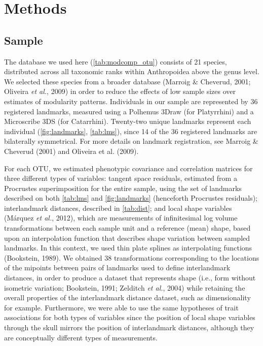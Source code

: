 \documentclass[12pt,twoside]{report}
\begin{document}
\section{Methods}\label{methods}

\subsection{Sample}\label{sample}

The database we used here (\autoref{tab:modcomp_otu}) consists of 21
species, distributed across all taxonomic ranks within Anthropoidea
above the genus level. We selected these species from a broader database
(Marroig \& Cheverud, 2001; Oliveira \emph{et al.}, 2009) in order to
reduce the effects of low sample sizes over estimates of modularity
patterns. Individuals in our sample are represented by 36 registered
landmarks, measured using a Polhemus 3Draw (for Platyrrhini) and a
Microscribe 3DS (for Catarrhini). Twenty-two unique landmarks represent
each individual (\autoref{fig:landmarks}, \autoref{tab:lms}), since 14
of the 36 registered landmarks are bilaterally symmetrical. For more
details on landmark registration, see Marroig \& Cheverud (2001) and
Oliveira et al. (2009).



For each OTU, we estimated phenotypic covariance and correlation
matrices for three different types of variables: tangent space
residuals, estimated from a Procrustes superimposition for the entire
sample, using the set of landmarks described on both \autoref{tab:lms}
and \autoref{fig:landmarks} (henceforth Procrustes residuals);
interlandmark distances, described in \autoref{tab:dist}; and local
shape variables (Márquez \emph{et al.}, 2012), which are measurements of
infinitesimal log volume transformations between each sample unit and a
reference (mean) shape, based upon an interpolation function that
describes shape variation between sampled landmarks. In this context, we
used thin plate splines as interpolating functions (Bookstein, 1989). We
obtained 38 transformations corresponding to the locations of the
mipoints between pairs of landmarks used to define interlandmark
distances, in order to produce a dataset that represents shape (i.e.,
form without isometric variation; Bookstein, 1991; Zelditch \emph{et
al.}, 2004) while retaining the overall properties of the interlandmark
distance dataset, such as dimensionality for example. Furthermore, we
were able to use the same hypotheses of trait associations for both
types of variables since the position of local shape variables through
the skull mirrors the position of interlandmark distances, although they
are conceptually different types of measurements.
\end{document}
